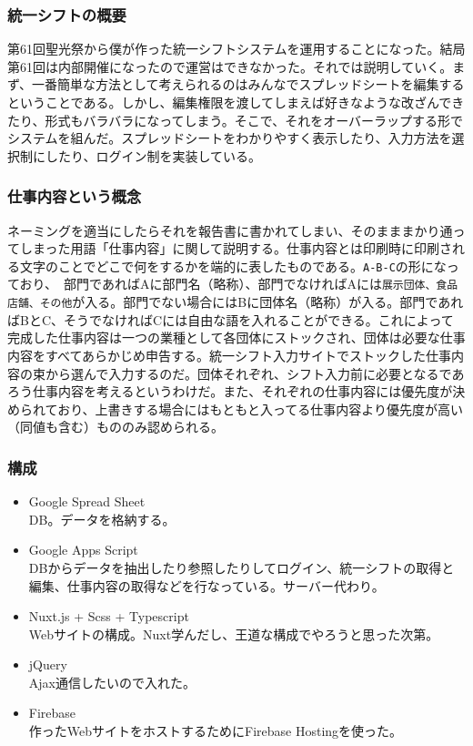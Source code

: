 \documentclass[dvipdfmx,jb5]{jarticle}
\begin{document}
  \subsubsection{統一シフトの概要}
  第61回聖光祭から僕が作った統一シフトシステムを運用することになった。結局第61回は内部開催になったので運営はできなかった。それでは説明していく。まず、一番簡単な方法として考えられるのはみんなでスプレッドシートを編集するということである。しかし、編集権限を渡してしまえば好きなような改ざんできたり、形式もバラバラになってしまう。そこで、それをオーバーラップする形でシステムを組んだ。スプレッドシートをわかりやすく表示したり、入力方法を選択制にしたり、ログイン制を実装している。
  \subsubsection{仕事内容という概念}
  ネーミングを適当にしたらそれを報告書に書かれてしまい、そのまままかり通ってしまった用語「仕事内容」に関して説明する。仕事内容とは印刷時に印刷される文字のことでどこで何をするかを端的に表したものである。\verb+A-B-C+の形になっており、　部門であればAに部門名（略称）、部門でなければAには\verb+展示団体、食品店舗、その他+が入る。部門でない場合にはBに団体名（略称）が入る。部門であればBとC、そうでなければCには自由な語を入れることができる。これによって完成した仕事内容は一つの業種として各団体にストックされ、団体は必要な仕事内容をすべてあらかじめ申告する。統一シフト入力サイトでストックした仕事内容の束から選んで入力するのだ。団体それぞれ、シフト入力前に必要となるであろう仕事内容を考えるというわけだ。また、それぞれの仕事内容には優先度が決められており、上書きする場合にはもともと入ってる仕事内容より優先度が高い（同値も含む）もののみ認められる。
  \subsubsection{構成}
  \begin{itemize}
  \item Google Spread Sheet\\
  DB。データを格納する。
   \item Google Apps Script\\
   DBからデータを抽出したり参照したりしてログイン、統一シフトの取得と編集、仕事内容の取得などを行なっている。サーバー代わり。
   \item Nuxt.js + Scss + Typescript\\
   Webサイトの構成。Nuxt学んだし、王道な構成でやろうと思った次第。
   \item jQuery\\
   Ajax通信したいので入れた。
   \item Firebase\\
   作ったWebサイトをホストするためにFirebase Hostingを使った。
  \end{itemize}
\end{document}
